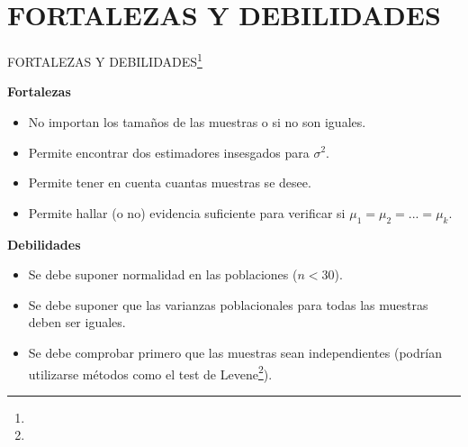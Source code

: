 \section{FORTALEZAS Y DEBILIDADES}
\begin{frame}{FORTALEZAS Y DEBILIDADES\footnote{}}
\begin{multicols}{2}
\textbf{Fortalezas}
\begin{itemize}
    \item No importan los tamaños de las muestras o si no son iguales.
    \item Permite encontrar dos estimadores insesgados para $\sigma^2$.
    \item Permite tener en cuenta cuantas muestras se desee.
    \item Permite hallar (o no) evidencia suficiente para verificar si $\mu_1=\mu_2=...=\mu_k$.
\end{itemize}
\columnbreak
\textbf{Debilidades}
\begin{itemize}
    \item Se debe suponer normalidad en las poblaciones ($n<30$).
    \item Se debe suponer que las varianzas poblacionales para todas las muestras deben ser iguales.
    \item Se debe comprobar primero que las muestras sean independientes (podrían utilizarse métodos como el test de Levene\footnote{}).
\end{itemize}
\end{multicols}
\end{frame}